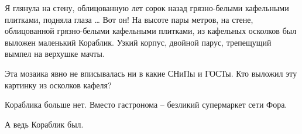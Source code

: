Я глянула на стену, облицованную лет сорок назад грязно-белыми кафельными
плитками, подняла глаза … Вот он! На высоте пары метров, на стене, облицованной
грязно-белыми кафельными плитками, из кафельных осколков был выложен маленький
Кораблик. Узкий корпус, двойной парус, трепещущий вымпел на верхушке мачты.

Эта мозаика явно не вписывалась ни в какие СНиПы и ГОСТы. Кто выложил эту
картинку из осколков кафеля? 

Кораблика больше нет. Вместо гастронома – безликий супермаркет сети Фора.

А ведь Кораблик был.

